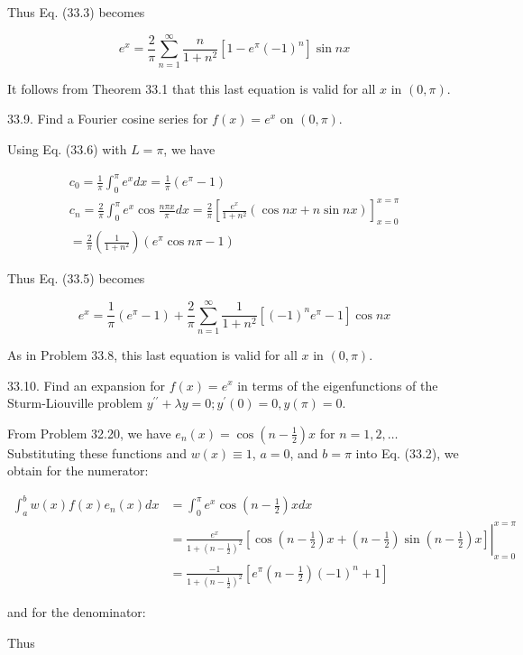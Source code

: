 \documentclass[10pt]{article}
\begin{document}
Thus Eq. (33.3) becomes

$$
e^{x}=\frac{2}{\pi} \sum_{n=1}^{\infty} \frac{n}{1+n^{2}}\left[1-e^{\pi}(-1)^{n}\right] \sin n x
$$

It follows from Theorem 33.1 that this last equation is valid for all $x$ in $(0, \pi)$.

33.9. Find a Fourier cosine series for $f(x)=e^{x}$ on $(0, \pi)$.

Using Eq. (33.6) with $L=\pi$, we have

$$
\begin{gathered}
c_{0}=\frac{1}{\pi} \int_{0}^{\pi} e^{x} d x=\frac{1}{\pi}\left(e^{\pi}-1\right) \\
c_{n}=\frac{2}{\pi} \int_{0}^{\pi} e^{x} \cos \frac{n \pi x}{\pi} d x=\frac{2}{\pi}\left[\frac{e^{x}}{1+n^{2}}(\cos n x+n \sin n x)\right]_{x=0}^{x=\pi} \\
=\frac{2}{\pi}\left(\frac{1}{1+n^{2}}\right)\left(e^{\pi} \cos n \pi-1\right)
\end{gathered}
$$

Thus Eq. (33.5) becomes

$$
e^{x}=\frac{1}{\pi}\left(e^{\pi}-1\right)+\frac{2}{\pi} \sum_{n=1}^{\infty} \frac{1}{1+n^{2}}\left[(-1)^{n} e^{\pi}-1\right] \cos n x
$$

As in Problem 33.8, this last equation is valid for all $x$ in $(0, \pi)$.

33.10. Find an expansion for $f(x)=e^{x}$ in terms of the eigenfunctions of the Sturm-Liouville problem $y^{\prime \prime}+\lambda y=0 ; y^{\prime}(0)=0, y(\pi)=0$.

From Problem 32.20, we have $e_{n}(x)=\cos \left(n-\frac{1}{2}\right) x$ for $n=1,2, \ldots$ Substituting these functions and $w(x) \equiv 1$, $a=0$, and $b=\pi$ into Eq. (33.2), we obtain for the numerator:

$$
\begin{aligned}
\int_{a}^{b} w(x) f(x) e_{n}(x) d x & =\int_{0}^{\pi} e^{x} \cos \left(n-\frac{1}{2}\right) x d x \\
& =\left.\frac{e^{x}}{1+\left(n-\frac{1}{2}\right)^{2}}\left[\cos \left(n-\frac{1}{2}\right) x+\left(n-\frac{1}{2}\right) \sin \left(n-\frac{1}{2}\right) x\right]\right|_{x=0} ^{x=\pi} \\
& =\frac{-1}{1+\left(n-\frac{1}{2}\right)^{2}}\left[e^{\pi}\left(n-\frac{1}{2}\right)(-1)^{n}+1\right]
\end{aligned}
$$

and for the denominator:

Thus
\end{document}

